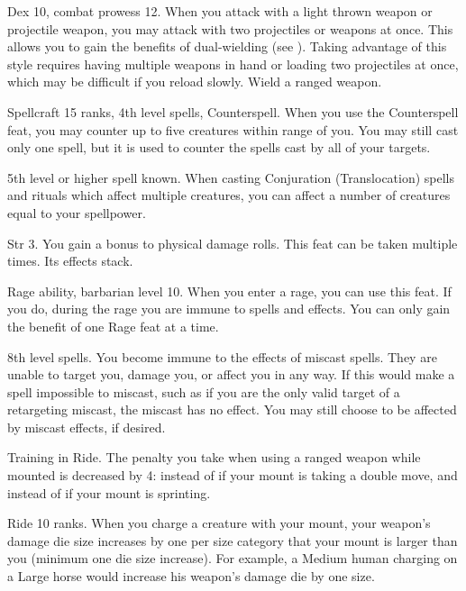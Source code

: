 \featpres Dex 10, combat prowess 12.
\featben When you attack with a light thrown weapon or projectile weapon, you may attack with two projectiles or weapons at once.
This allows you to gain the benefits of dual-wielding (see ).
Taking advantage of this style requires having multiple weapons in hand or loading two projectiles at once, which may be difficult if you reload slowly.
\stylereq Wield a ranged weapon.

\featpres Spellcraft 15 ranks, 4th level spells, Counterspell.
\featben When you use the Counterspell feat, you may counter up to five creatures within \rngmed range of you.
You may still cast only one spell, but it is used to counter the spells cast by all of your targets.

\featpre 5th level or higher  spell known.
\featben When casting Conjuration (Translocation) spells and rituals which affect multiple creatures, you can affect a number of creatures equal to your spellpower.

\featpres Str 3.
\featben You gain a  bonus to physical damage rolls.
 This feat can be taken multiple times. Its effects stack.

\featpre Rage ability, barbarian level 10.
\featben When you enter a rage, you can use this feat. If you do, during the rage you are immune to  spells and effects.
 You can only gain the benefit of one Rage feat at a time.

\featpre 8th level spells.
\featben You become immune to the effects of miscast spells.
They are unable to target you, damage you, or affect you in any way.
If this would make a spell impossible to miscast, such as if you are the only valid target of a retargeting miscast, the miscast has no effect.
You may still choose to be affected by miscast effects, if desired.

\featpre Training in Ride.
\featben The penalty you take when using a ranged weapon while mounted is decreased by 4:  instead of  if your mount is taking a double move, and  instead of  if your mount is sprinting.

\featpre Ride 10 ranks.
\featben When you charge a creature with your mount, your weapon's damage die size increases by one per size category that your mount is larger than you (minimum one die size increase).
For example, a Medium human charging on a Large horse would increase his weapon's damage die by one size.

